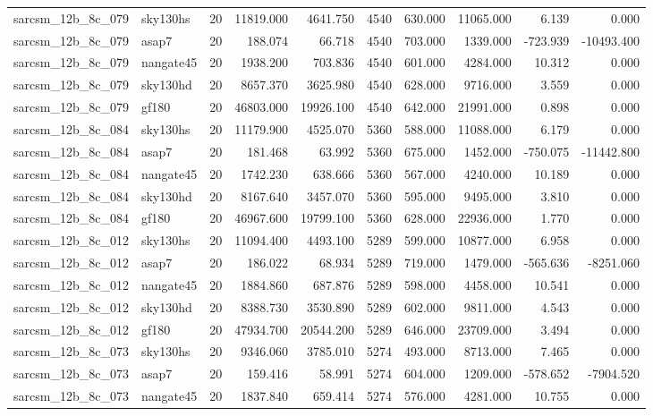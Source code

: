 \begin{tabular}{llrrrrrrrr}
sarcsm\_12b\_8c\_079 & sky130hs & 20 & 11819.000 & 4641.750 & 4540 & 630.000 & 11065.000 & 6.139 & 0.000 \\
sarcsm\_12b\_8c\_079 & asap7 & 20 & 188.074 & 66.718 & 4540 & 703.000 & 1339.000 & -723.939 & -10493.400 \\
sarcsm\_12b\_8c\_079 & nangate45 & 20 & 1938.200 & 703.836 & 4540 & 601.000 & 4284.000 & 10.312 & 0.000 \\
sarcsm\_12b\_8c\_079 & sky130hd & 20 & 8657.370 & 3625.980 & 4540 & 628.000 & 9716.000 & 3.559 & 0.000 \\
sarcsm\_12b\_8c\_079 & gf180 & 20 & 46803.000 & 19926.100 & 4540 & 642.000 & 21991.000 & 0.898 & 0.000 \\
sarcsm\_12b\_8c\_084 & sky130hs & 20 & 11179.900 & 4525.070 & 5360 & 588.000 & 11088.000 & 6.179 & 0.000 \\
sarcsm\_12b\_8c\_084 & asap7 & 20 & 181.468 & 63.992 & 5360 & 675.000 & 1452.000 & -750.075 & -11442.800 \\
sarcsm\_12b\_8c\_084 & nangate45 & 20 & 1742.230 & 638.666 & 5360 & 567.000 & 4240.000 & 10.189 & 0.000 \\
sarcsm\_12b\_8c\_084 & sky130hd & 20 & 8167.640 & 3457.070 & 5360 & 595.000 & 9495.000 & 3.810 & 0.000 \\
sarcsm\_12b\_8c\_084 & gf180 & 20 & 46967.600 & 19799.100 & 5360 & 628.000 & 22936.000 & 1.770 & 0.000 \\
sarcsm\_12b\_8c\_012 & sky130hs & 20 & 11094.400 & 4493.100 & 5289 & 599.000 & 10877.000 & 6.958 & 0.000 \\
sarcsm\_12b\_8c\_012 & asap7 & 20 & 186.022 & 68.934 & 5289 & 719.000 & 1479.000 & -565.636 & -8251.060 \\
sarcsm\_12b\_8c\_012 & nangate45 & 20 & 1884.860 & 687.876 & 5289 & 598.000 & 4458.000 & 10.541 & 0.000 \\
sarcsm\_12b\_8c\_012 & sky130hd & 20 & 8388.730 & 3530.890 & 5289 & 602.000 & 9811.000 & 4.543 & 0.000 \\
sarcsm\_12b\_8c\_012 & gf180 & 20 & 47934.700 & 20544.200 & 5289 & 646.000 & 23709.000 & 3.494 & 0.000 \\
sarcsm\_12b\_8c\_073 & sky130hs & 20 & 9346.060 & 3785.010 & 5274 & 493.000 & 8713.000 & 7.465 & 0.000 \\
sarcsm\_12b\_8c\_073 & asap7 & 20 & 159.416 & 58.991 & 5274 & 604.000 & 1209.000 & -578.652 & -7904.520 \\
sarcsm\_12b\_8c\_073 & nangate45 & 20 & 1837.840 & 659.414 & 5274 & 576.000 & 4281.000 & 10.755 & 0.000 \\

\end{tabular}
